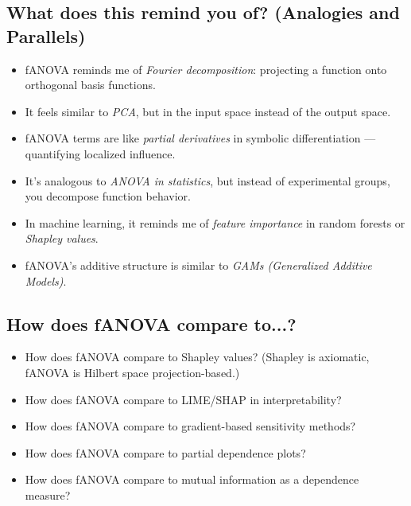 \subsection*{What does this remind you of? (Analogies and Parallels)}
\begin{itemize}
    \item fANOVA reminds me of \emph{Fourier decomposition}: projecting a function onto orthogonal basis functions.
    \item It feels similar to \emph{PCA}, but in the input space instead of the output space.
    \item fANOVA terms are like \emph{partial derivatives} in symbolic differentiation — quantifying localized influence.
    \item It’s analogous to \emph{ANOVA in statistics}, but instead of experimental groups, you decompose function behavior.
    \item In machine learning, it reminds me of \emph{feature importance} in random forests or \emph{Shapley values}.
    \item fANOVA’s additive structure is similar to \emph{GAMs (Generalized Additive Models)}.
\end{itemize}

\subsection*{How does fANOVA compare to...?}
\begin{itemize}
    \item How does fANOVA compare to Shapley values? (Shapley is axiomatic, fANOVA is Hilbert space projection-based.)
    \item How does fANOVA compare to LIME/SHAP in interpretability?
    \item How does fANOVA compare to gradient-based sensitivity methods?
    \item How does fANOVA compare to partial dependence plots?
    \item How does fANOVA compare to mutual information as a dependence measure?
\end{itemize}
